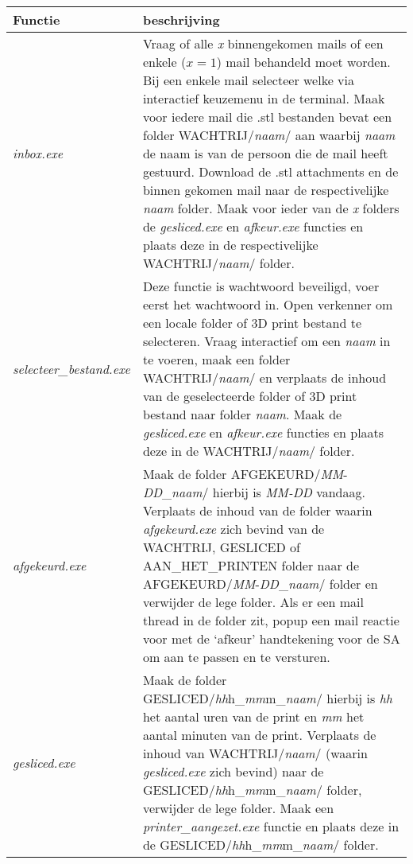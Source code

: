 \documentclass{article}
\begin{document}
\begin{table}[H]
\hspace{-2cm}
    \begin{tabular}%
    {>{\raggedright\arraybackslash}p{}%
    |>{\raggedright\arraybackslash}p{}}
    \rowcolor{myblue}
    Functie & beschrijving\\\hline

  \textit{inbox.exe}& Vraag of alle \textit{x} binnengekomen mails of een enkele ($x=1$) mail behandeld moet worden. Bij een enkele mail selecteer welke via interactief keuzemenu in de terminal. Maak voor iedere mail die .stl bestanden bevat een folder WACHTRIJ/\textit{naam}/ aan waarbij \textit{naam} de naam is van de persoon die de mail heeft gestuurd. Download de .stl attachments en de binnen gekomen mail naar de respectivelijke \textit{naam} folder. Maak voor ieder van de \textit{x} folders de \textit{gesliced.exe} en \textit{afkeur.exe} functies en plaats deze in de respectivelijke WACHTRIJ/\textit{naam}/ folder.\\

\textit{selecteer\_bestand.exe}& Deze functie is wachtwoord beveiligd, voer eerst het wachtwoord in. Open verkenner om een locale folder of 3D print bestand te selecteren. Vraag interactief om een \textit{naam} in te voeren, maak een folder WACHTRIJ/\textit{naam}/ en verplaats de inhoud van de geselecteerde folder of 3D print bestand naar folder \textit{naam}. Maak de \textit{gesliced.exe} en \textit{afkeur.exe} functies en plaats deze in de WACHTRIJ/\textit{naam}/ folder.\\

\textit{afgekeurd.exe}& 
Maak de folder AFGEKEURD/\textit{MM}-\textit{DD}\_\textit{naam}/ hierbij is \textit{MM-DD} vandaag. Verplaats de inhoud van de folder waarin \textit{afgekeurd.exe} zich bevind van de WACHTRIJ, GESLICED of AAN\_HET\_PRINTEN folder naar de AFGEKEURD/\textit{MM}-\textit{DD}\_\textit{naam}/ folder en verwijder de lege folder. Als er een mail thread in de folder zit, popup een mail reactie voor met de `afkeur' handtekening voor de SA om aan te passen en te versturen.\\

\textit{gesliced.exe}& Maak de folder GESLICED/\textit{hh}h\_\textit{mm}m\_\textit{naam}/ hierbij is \textit{hh} het aantal uren van de print en \textit{mm} het aantal minuten van de print. Verplaats de inhoud van WACHTRIJ/\textit{naam}/ (waarin \textit{gesliced.exe} zich bevind) naar de GESLICED/\textit{hh}h\_\textit{mm}m\_\textit{naam}/ folder, verwijder de lege folder. Maak een \textit{printer\_aangezet.exe} functie en plaats deze in de GESLICED/\textit{hh}h\_\textit{mm}m\_\textit{naam}/ folder.\\


\end{tabular}
\end{table}
\end{document}
